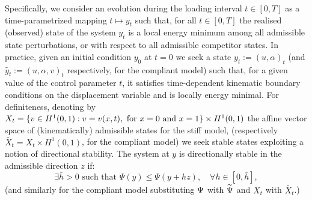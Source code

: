 \documentclass[10pt]{article}
\begin{document}
%
Specifically, we consider an evolution during the loading interval $t\in [0, T]$ as a time-parametrized mapping $t\mapsto y_t$  such that, for all $t\in [0, T]$ the realised (observed) state of the system $y_t$ is a local energy minimum among all admissible state perturbations, or with respect to all admissible competitor states. %
In practice, given an initial condition $y_0$ at $t=0$ we seek a state $y_t:=(u, \alpha)_t$ (and $\widetilde{y_t}:=(u, \alpha, v)_t$ respectively, for the compliant model) such that, for a given value of the control parameter $t$, it satisfies time-dependent kinematic boundary conditions on the displacement variable and is locally energy minimal.
For definiteness, denoting by $X_t = \{v\in H^1(0, 1):v=v(x, t),\text{ for } x=0\text{ and } x=1\}\times H^1(0,1)$ the affine vector space of (kinematically) admissible states for the stiff model, (respectively $\widetilde{X_t} = X_t\times H^1(0, 1)$, for the compliant model)
we seek {stable states exploiting a notion of directional stability.}
    {The system at $y$ is directionally stable in the admissible direction $z$ if:}
\begin{equation}
    \exists  \bar{h} > 0  \text{ such that }  \Psi(y) \leq \Psi(y + h z), \quad \forall h \in [0, \bar{h}],
    \label{eq:variational_global_ineq}
\end{equation}
(and similarly for the compliant model substituting $\Psi$ with $\widetilde\Psi$ and $X_t$ with $\widetilde{X_t}$.)
\end{document}
